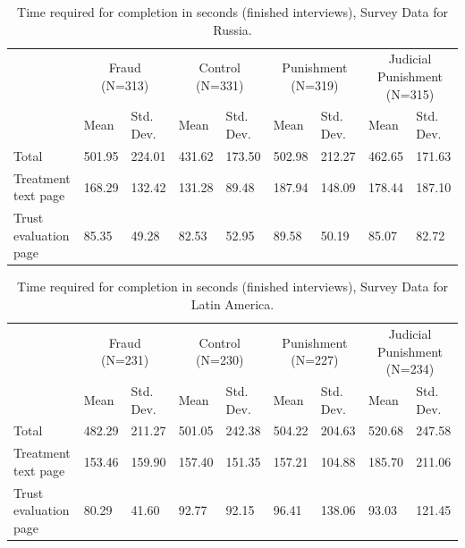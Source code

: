 \documentclass[11pt, ngerman,english,a4]{article}
\begin{document}
\begin{landscape}

\begin{table}
\centering
\caption{Time required for completion in seconds (finished interviews), Survey Data for Russia.} 
\begin{tabular}[t]{lllllllll}
\toprule
\multicolumn{1}{c}{ } & \multicolumn{2}{c}{Fraud (N=313)} & \multicolumn{2}{c}{Control (N=331)} & \multicolumn{2}{c}{Punishment (N=319)} & \multicolumn{2}{c}{Judicial Punishment (N=315)} \\
\cmidrule(l{3pt}r{3pt}){2-3} \cmidrule(l{3pt}r{3pt}){4-5} \cmidrule(l{3pt}r{3pt}){6-7} \cmidrule(l{3pt}r{3pt}){8-9}
  & Mean & Std. Dev. & Mean  & Std. Dev.  & Mean   & Std. Dev.   & Mean    & Std. Dev.   \\
\midrule
Total & 501.95 & 224.01 & 431.62 & 173.50 & 502.98 & 212.27 & 462.65 & 171.63\\
Treatment text page & 168.29 & 132.42 & 131.28 & 89.48 & 187.94 & 148.09 & 178.44 & 187.10\\
Trust evaluation page & 85.35 & 49.28 & 82.53 & 52.95 & 89.58 & 50.19 & 85.07 & 82.72\\
\bottomrule
\end{tabular}
\end{table}

\begin{table}
\centering
\caption{Time required for completion in seconds (finished interviews), Survey Data for Latin America.} 
\begin{tabular}[t]{lllllllll}
\toprule
\multicolumn{1}{c}{ } & \multicolumn{2}{c}{Fraud (N=231)} & \multicolumn{2}{c}{Control (N=230)} & \multicolumn{2}{c}{Punishment (N=227)} & \multicolumn{2}{c}{Judicial Punishment (N=234)} \\
\cmidrule(l{3pt}r{3pt}){2-3} \cmidrule(l{3pt}r{3pt}){4-5} \cmidrule(l{3pt}r{3pt}){6-7} \cmidrule(l{3pt}r{3pt}){8-9}
  & Mean & Std. Dev. & Mean  & Std. Dev.  & Mean   & Std. Dev.   & Mean    & Std. Dev.   \\
\midrule
Total & 482.29 & 211.27 & 501.05 & 242.38 & 504.22 & 204.63 & 520.68 & 247.58\\
Treatment text page & 153.46 & 159.90 & 157.40 & 151.35 & 157.21 & 104.88 & 185.70 & 211.06\\
Trust evaluation page & 80.29 & 41.60 & 92.77 & 92.15 & 96.41 & 138.06 & 93.03 & 121.45\\
\bottomrule
\end{tabular}
\end{table}

\end{landscape}
\end{document}
